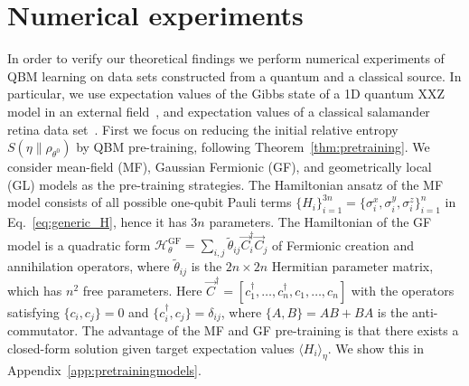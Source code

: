 \documentclass[
    aps,
    prx,
    onecolumn
]{revtex4-2}
\begin{document}
\section*{Numerical experiments}

In order to verify our theoretical findings we perform numerical experiments of QBM learning on data sets constructed from a quantum and a classical source. In particular, we use expectation values of the Gibbs state of a 1D quantum XXZ model in an external field~\cite{Heisenberg1928, Franchini_2017}, and expectation values of a classical salamander retina data set~\cite{Tkacik2014}. 
First we focus on reducing the initial relative entropy $S(\eta \|\rho_{\theta^0})$ by QBM pre-training, following Theorem~\ref{thm:pretraining}. We consider mean-field (MF), Gaussian Fermionic (GF), and geometrically local (GL) models as the pre-training strategies. The Hamiltonian ansatz of the MF model consists of all possible one-qubit Pauli terms $\{H_i\}_{i=1}^{3n}=\{ \sigma_i^x, \sigma_i^y, \sigma_i^z\}_{i=1}^{n}$ in Eq.~\eqref{eq:generic_H}, hence it has $3n$ parameters. The Hamiltonian of the GF model is a quadratic form $\mathcal{H}_\theta^{\mathrm{GF}}= \sum_{i,j}\tilde{\theta}_{ij}\vec{
C}_i^\dagger \vec{C}_j$ of Fermionic creation and annihilation operators, where $\tilde{\theta}_{ij}$ is the $2n\times 2n$ Hermitian parameter matrix, which has $n^2$ free parameters. Here $\vec{C}^\dagger = [c_1^\dagger, \dots, c_n^\dagger, c_1, \dots, c_n]$ with the operators satisfying $\{c_i, c_j\} = 0$ and $\{c_i^\dagger, c_j\}=\delta_{ij}$, where $\{A, B\} = AB + BA$ is the anti-commutator. The advantage of the MF and GF pre-training is that there exists a closed-form solution given target expectation values $\langle H_i \rangle_\eta$. We show this in Appendix~\ref{app:pretrainingmodels}.
\end{document}
